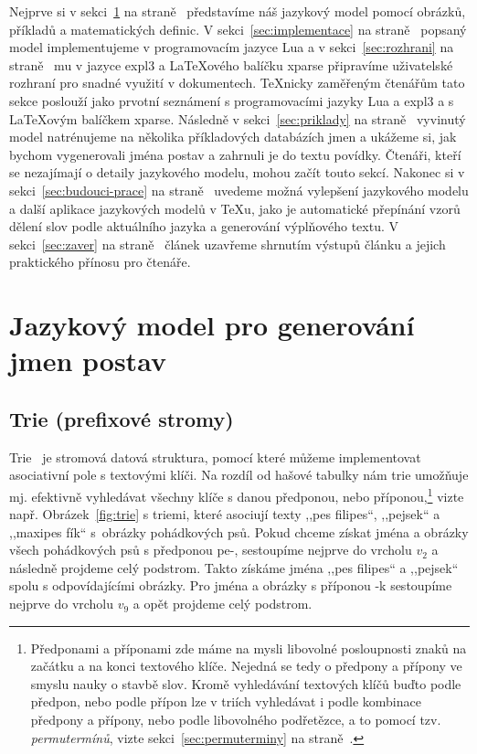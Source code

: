 \documentclass{csbulletin}
\newcommand\vref[1]{\ref{#1} na straně~\pageref{#1}}
\begin{document}
Nejprve si v sekci~\vref{sec:definice} představíme náš jazykový model pomocí obrázků, příkladů a matematických definic. V sekci~\vref{sec:implementace} popsaný model implementujeme v programovacím jazyce Lua a v sekci~\vref{sec:rozhrani} mu v jazyce expl3 a \LaTeX ového balíčku xparse připravíme uživatelské rozhraní pro snadné využití v dokumentech. \TeX nicky zaměřeným čtenářům tato sekce poslouží jako prvotní seznámení s programovacími jazyky Lua a expl3 a s \LaTeX ovým balíčkem xparse. Následně v sekci~\vref{sec:priklady} vyvinutý model natrénujeme na několika příkladových databázích jmen a ukážeme si, jak bychom vygenerovali jména postav a zahrnuli je do textu povídky. Čtenáři, kteří se nezajímají o detaily jazykového modelu, mohou začít touto sekcí. Nakonec si v sekci~\vref{sec:budouci-prace} uvedeme možná vylepšení jazykového modelu a další aplikace jazykových modelů v \TeX u, jako je automatické přepínání vzorů dělení slov podle aktuálního jazyka a generování výplňového textu. V sekci~\vref{sec:zaver} článek uzavřeme shrnutím výstupů článku a jejich praktického přínosu pro čtenáře.

\section{Jazykový model pro generování jmen postav}
\label{sec:definice}
\subsection{Trie (prefixové stromy)}
Trie~\cite{knuth1997digital} je stromová datová struktura, pomocí které můžeme implementovat asociativní pole s textovými klíči. Na rozdíl od hašové tabulky nám trie umožňuje mj. efektivně vyhledávat všechny klíče s danou předponou, nebo příponou,\footnote{Předponami a příponami zde máme na mysli libovolné posloupnosti znaků na začátku a na konci textového klíče. Nejedná se tedy o předpony a přípony ve smyslu nauky o stavbě slov. Kromě vyhledávání textových klíčů buďto podle předpon, nebo podle přípon lze v triích vyhledávat i podle kombinace předpony a přípony, nebo podle libovolného podřetězce, a to pomocí tzv. \emph{permutermínů}, vizte sekci~\vref{sec:permuterminy}.} vizte např. Obrázek~\ref{fig:trie} s triemi, které asociují texty ,,pes filipes``, ,,pejsek`` a ,,maxipes fík`` s~obrázky pohádkových psů. Pokud chceme získat jména a obrázky všech pohádkových psů s předponou pe-, sestoupíme nejprve do vrcholu $v_2$ a následně projdeme celý podstrom. Takto získáme jména ,,pes filipes`` a ,,pejsek`` spolu s odpovídajícími obrázky. Pro jména a obrázky s příponou -k sestoupíme nejprve do vrcholu $v_9$ a opět projdeme celý podstrom.
\end{document}
